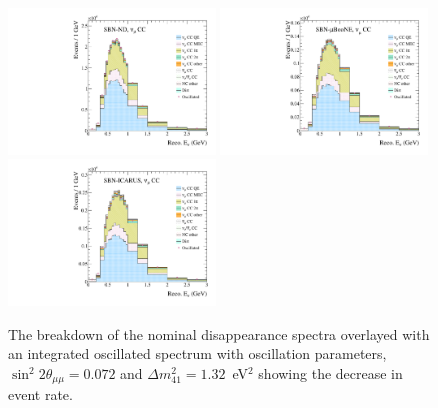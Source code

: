 \begin{figure}[h!]
  {\includegraphics[width=0.49\textwidth]{figures-chap6/spectra/numu_disapp_overlay_dmsq_1.32_sinsq2th_0.072_spectrum_sbn_nd_BNB_FHC_0_modes.pdf}}
  {\includegraphics[width=0.49\textwidth]{figures-chap6/spectra/numu_disapp_overlay_dmsq_1.32_sinsq2th_0.072_spectrum_sbn_uboone_BNB_FHC_1_modes.pdf}}
  {\includegraphics[width=0.49\textwidth]{figures-chap6/spectra/numu_disapp_overlay_dmsq_1.32_sinsq2th_0.072_spectrum_sbn_icarus_BNB_FHC_2_modes.pdf}}
  \captionsetup{width=0.49\textwidth}
  \parbox[b]{0.49\textwidth}%
  {
    \caption[SBN \numu CC inclusive reconstructed neutrino energy spectra with oscillated spectrum overlayed]{The breakdown of the nominal \numu disappearance spectra overlayed with an integrated oscillated spectrum with oscillation parameters, $\sin^2{2\theta_{\mu \mu}} = 0.072$ and $\Delta m^2_{41} = 1.32$~eV$^2$ showing the decrease in event rate.\\\phantom{.}\\\phantom{.}\\\phantom{.}\\}
    \label{fig:numu_disapp_spectra} 
  }
\end{figure}


